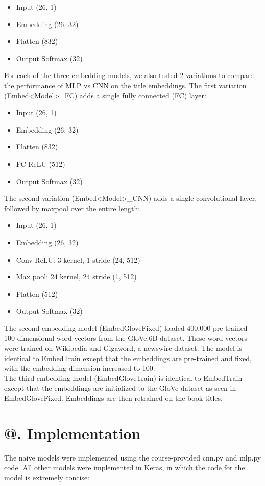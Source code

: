 \documentclass[jou,apacite, 10px]{apa6}
\makeatletter
\newcommand*{\rom}[1]{\expandafter\@slowromancap\romannumeral #1@}
\makeatother
\begin{document}
\begin{itemize}
    \item Input (26, 1)
    \item Embedding (26, 32)
    \item Flatten (832)
    \item Output Softmax (32)
\end{itemize}
For each of the three embedding models, we also tested 2 variations to compare the performance of MLP vs CNN on the title embeddings. The first variation (Embed<Model>\_FC) adds a single fully connected (FC) layer:\\
\begin{itemize}
    \item Input (26, 1)
    \item Embedding (26, 32)
    \item Flatten (832)
    \item FC ReLU (512)
    \item Output Softmax (32)
\end{itemize}\rule{0pt}{4ex}
The second variation (Embed<Model>\_CNN) adds a single convolutional layer, followed by maxpool over the entire length:

\begin{itemize}
    \item Input (26, 1)
    \item Embedding (26, 32)
    \item Conv ReLU: 3 kernel, 1 stride (24, 512)
    \item Max pool: 24 kernel, 24 stride (1, 512)
    \item Flatten (512)
    \item Output Softmax (32)
\end{itemize}
The second embedding model (EmbedGloveFixed) loaded 400,000 pre-trained 100-dimensional word-vectors from the GloVe.6B dataset. These word vectors were trained on Wikipedia and Gigaword, a newswire dataset. The model is identical to EmbedTrain except that the embeddings are pre-trained and fixed, with the embedding dimension increased to 100.\\
The third embedding model (EmbedGloveTrain) is identical to EmbedTrain except that the embeddings are initialized to the GloVe dataset as seen in EmbedGloveFixed. Embeddings are then retrained on the book titles.\\

\section{\rom{4}. Implementation}
The naive models were implemented using the course-provided cnn.py and mlp.py code. All other models were implemented in Keras, in which the code for the model is extremely concise:\\

\end{document}
